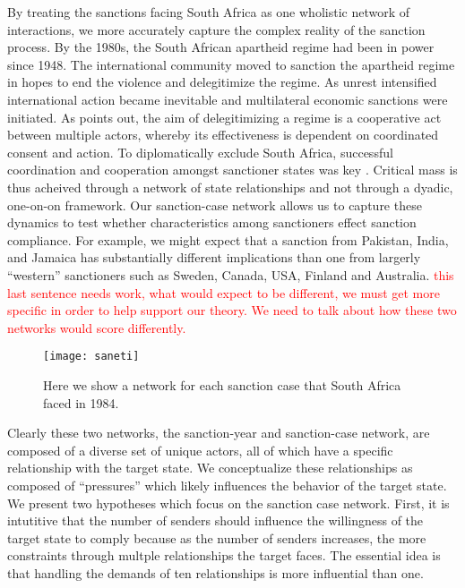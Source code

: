 By treating the sanctions facing South Africa as one wholistic network of interactions, we more accurately capture the complex reality of the sanction process. By the 1980s, the South African apartheid regime had been in power since 1948. The international community moved to sanction the apartheid regime in hopes to end the violence and delegitimize the regime. As unrest intensified international action became inevitable and multilateral economic sanctions were initiated. As \citet{kinne2013dependent} points out, the aim of delegitimizing a regime is a cooperative act between multiple actors, whereby its effectiveness is dependent on coordinated consent and action. To diplomatically exclude South Africa, successful coordination and cooperation amongst sanctioner states was key \citep{kinne2013dependent,christopher1994pattern}. Critical mass is thus acheived through a network of state relationships and not through a dyadic, one-on-on framework. Our sanction-case network allows us to capture these dynamics to test whether characteristics among sanctioners effect sanction compliance. For example, we might expect that a sanction from Pakistan, India, and Jamaica has substantially different implications than one from largerly ``western'' sanctioners such as Sweden, Canada, USA, Finland and Australia. \textcolor{red}{this last sentence needs work, what would expect to be different, we must get more specific in order to help support our theory. We need to talk about how these two networks would score differently.}
 


\begin{figure}[ht]
	\centering
	\texttt{[image: saneti]}
	\caption{Here we show a network for each sanction case that South Africa faced in 1984.}
	\label{fig:saneti}
\end{figure}
\FloatBarrier

Clearly these two networks, the sanction-year and sanction-case network, are composed of a diverse set of unique actors, all of which have a specific relationship with the target state. We conceptualize these relationships as composed of ``pressures'' which likely influences the behavior of the target state. We present two hypotheses which focus on the sanction case network. First, it is intutitive that the number of senders should influence the willingness of the target state to comply because as the number of senders increases, the more constraints through multple relationships the target faces. The essential idea is that handling the demands of ten relationships is more influential than one. 

